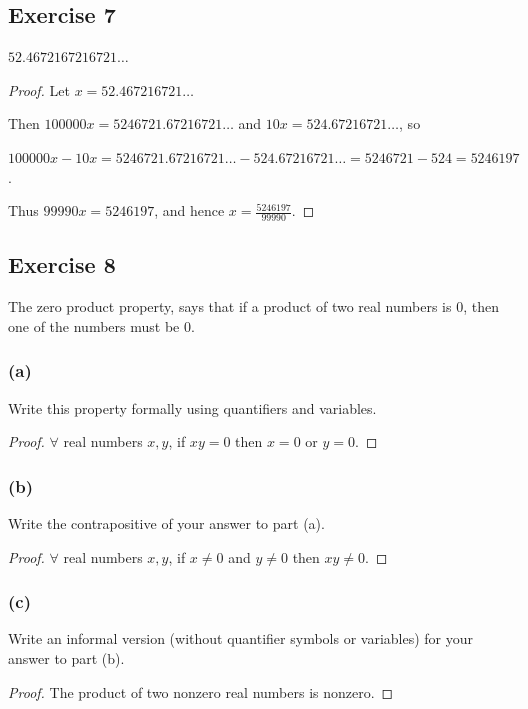 \documentclass[14pt]{extarticle}
\newcommand{\fa}{\forall}
\begin{document}
\subsection{Exercise 7}
$52.4672167216721\ldots$

\begin{proof}
Let $x = 52.467216721\ldots$

Then $100000x = 5246721.67216721\ldots$ and $10x = 524.67216721\ldots$, so 

$100000x - 10x = 5246721.67216721 \ldots - 524.67216721 \ldots = 5246721 - 524 = 5246197$. 

Thus $99990x = 5246197$, and hence $x = \frac{5246197}{99990}$.
\end{proof}

\subsection{Exercise 8}
The zero product property, says that if a product of two real numbers is 0, then one of the numbers must be 0.

\subsubsection{(a)}
Write this property formally using quantifiers and variables.

\begin{proof}
$\fa$ real numbers $x, y$, if $xy = 0$ then $x = 0$ or $y = 0$.
\end{proof}

\subsubsection{(b)}
Write the contrapositive of your answer to part (a).

\begin{proof}
$\fa$ real numbers $x, y$, if $x \neq 0$ and $y \neq 0$ then $xy \neq 0$.
\end{proof}

\subsubsection{(c)}
Write an informal version (without quantifier symbols or variables) for your answer to part (b).

\begin{proof}
The product of two nonzero real numbers is nonzero.
\end{proof}
\end{document}
